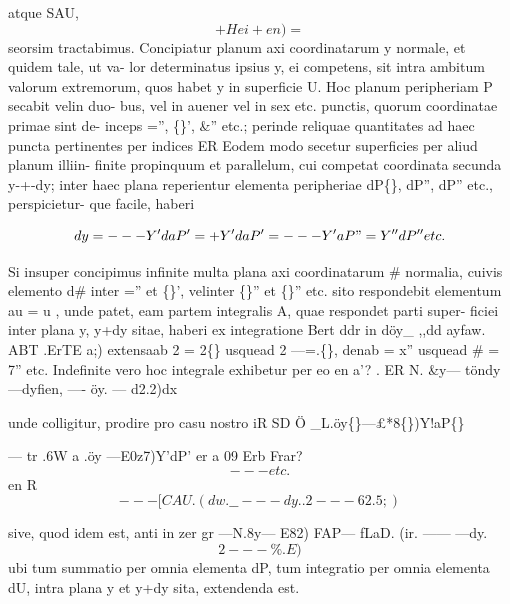 \documentclass[12pt,a4paper]{article}
\begin{document}
atque
SAU,
\[                         +Hei+                                                      en) =\]
seorsim tractabimus.
Concipiatur planum axi coordinatarum                     y normale,              et quidem tale, ut va-
lor determinatus ipsius y, ei competens, sit intra ambitum valorum extremorum,
quos habet y in superficie U. Hoc planum peripheriam P secabit velin duo-
bus, vel in auener vel in sex etc. punctis, quorum coordinatae primae sint de-
inceps ='', \guillemotleft\{\}', \&'' etc.; perinde reliquae quantitates ad haec puncta pertinentes per
indices ER                    Eodem modo secetur superficies per aliud planum illiin-
finite propinquum et parallelum,             cui competat coordinata secunda y-+-dy;                                  inter
haec plana reperientur elementa peripheriae                         dP\textregistered\{\}, dP'', dP'' etc.,               perspicietur-
que facile, haberi

\[             dy=---Y'daP'=+Y'daP'                        = ---Y'aP"                     = Y''dP''            etc.\]

Si insuper concipimus infinite multa plana axi coordinatarum            \# normalia,    cuivis
elemento d\# inter ='' et \guillemotleft\{\}', velinter         \guillemotleft\{\}'' et \textregistered\{\}'' etc. sito respondebit elementum
au = u       , unde patet, eam partem integralis A, quae respondet parti super-
ficiei inter plana y, y+dy    sitae, haberi ex integratione
Bert ddr in döy\_              ,,dd
ayfaw.          ABT   .ErTE              a;)
extensaab    2 = 2\textdegree\{\} usquead        2 ---=.\guillemotleft\{\},    denab       = x'' usquead           \# = 7'' etc.
Indefinite vero hoc integrale exhibetur per
eo                  en
a'?        .
ER            N. \&y--- töndy---dyfien,                   ----    öy. ---        d2.2)dx

unde colligitur, prodire pro casu nostro
iR    SD   Ö \_L.öy\textdegree\{\}---£*8\textdegree\{\})Y!aP\textregistered\{\}

--- tr            .6W a        .öy ---E0z7)Y'dP'
er               a         09       Erb Frar?
\[                  --- etc.\]
en          R
\[                  --- [CAU. (dw.         \_\_ ---dy..2---62.5;)\]

sive, quod idem est,
anti               in
zer        gr ---N.8y--- E82) FAP--- fLaD. (ir.                    ------ ---dy.
\[                                                                    2 ---\%.E)\]
ubi tum summatio per omnia elementa          dP,   tum integratio per omnia elementa
dU, intra plana y et y+dy         sita, extendenda est.
\end{document}
